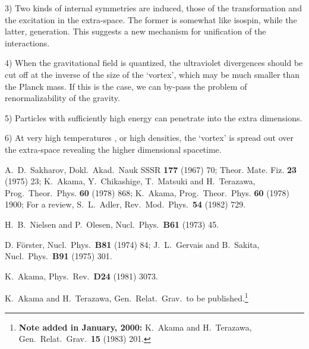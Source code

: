 \documentclass[a4paper,12pt]{article}
\begin{document}
\vskip0pt\noindent\hskip-20pt 3)\vskip-15pt\noindent 
Two kinds of internal symmetries are induced, those of the transformation and
the excitation in the extra-space. 
The former is somewhat like isospin,
while the latter, generation.
This suggests a new mechanism for unification of the interactions.

\vskip0pt\noindent\hskip-20pt 4)\vskip-15pt\noindent 
When the gravitational field is quantized, 
the ultraviolet divergences should be cut off at the inverse of the size of the `vortex', 
which may be much smaller than the Planck mass.
If this is the case, we can by-pass the problem of renormalizability of the gravity.

\vskip0pt\noindent\hskip-20pt 5)\vskip-15pt\noindent 
Particles with sufficiently high energy can penetrate into the extra dimensions.

\vskip0pt\noindent\hskip-20pt 6)\vskip-15pt\noindent 
At very high temperatures \cite{5}, or high densities, 
the `vortex' is spread out over the extra-space 
revealing the higher dimensional spacetime.


\begin{thebibliography}{99}
A.~D.~Sakharov,  Dokl.\ Akad.\ Nauk SSSR {\bf 177} (1967) 70;
Theor. Mate. Fiz. {\bf 23} (1975) 23;
K.~Akama, Y.~Chikashige, T.~Matsuki and H.~Terazawa,
	 {Prog.\ Theor.\ Phys.} {\bf 60} (1978) 868;
K.~Akama,  {Prog.\ Theor.\ Phys.} {\bf 60} (1978) 1900;
For a review, S.~L.~Adler, Rev.\ Mod.\ Phys.\ {\bf 54} (1982) 729. 

H.~B.~Nielsen and P.~Olesen, Nucl.\ Phys.\ {\bf B61} (1973) 45.

D. F\"orster, Nucl.\ Phys.\ {\bf B81} (1974) 84;
J.~L.~Gervais and B.~Sakita, Nucl.\ Phys.\ {\bf B91} (1975) 301.

K.~Akama, Phys.\ Rev.\ {\bf D24} (1981) 3073.

K.~Akama and H.~Terazawa, Gen.\ Relat.\ Grav.\ to be published.\footnote{
{\small\bf Note added in January, 2000:} 
K.~Akama and H.~Terazawa, Gen.\ Relat.\ Grav.\ {\bf 15} (1983) 201.
}

\end{thebibliography}
\end{document}
